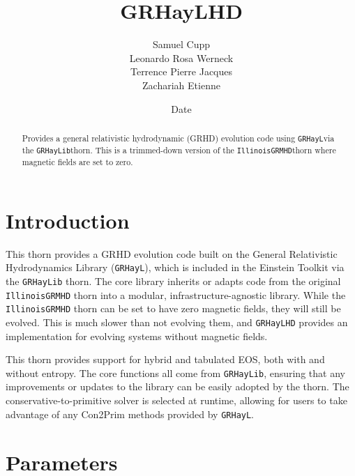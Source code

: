\documentclass{article}
\begin{document}
\title{GRHayLHD}
\author{Samuel Cupp \\ Leonardo Rosa Werneck \\ Terrence Pierre Jacques \\ Zachariah Etienne}
\date{$ $Date$ $}

\maketitle


\newcommand{\grhayl}{\texttt{GRHayL}}
\newcommand{\glib}{\texttt{GRHayLib}}
\newcommand{\ghd}{\texttt{GRHayLHD}}
\newcommand{\igm}{\texttt{IllinoisGRMHD}}
\newcommand{\hydrobase}{\texttt{HydroBase}}

\begin{abstract}
Provides a general relativistic hydrodynamic (GRHD) evolution code
using \grhayl via the \glib thorn. This is a trimmed-down version
of the \igm thorn where magnetic fields are set to zero.
\end{abstract}

\section{Introduction}

This thorn provides a GRHD evolution code built on
the General Relativistic Hydrodynamics Library (\grhayl),
which is included in the Einstein Toolkit via the \glib{}
thorn. The core library inherits or adapts code from the
original \igm{} thorn into a modular, infrastructure-agnostic
library. While the \igm{} thorn can be set to have
zero magnetic fields, they will still be evolved. This
is much slower than not evolving them, and \ghd{} provides an
implementation for evolving systems without magnetic
fields.

This thorn provides support for hybrid and tabulated EOS, both
with and without entropy. The core functions all come from \glib,
ensuring that any improvements or updates to the library can
be easily adopted by the thorn. The conservative-to-primitive
solver is selected at runtime, allowing for users to take
advantage of any Con2Prim methods provided by \grhayl.

\section{Parameters}
\end{document}
